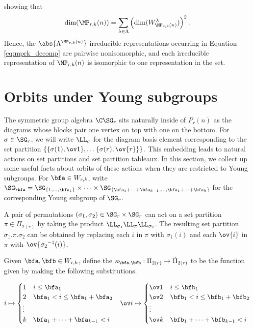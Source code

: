 showing that \begin{align*}
    \dim(\MP_{r,k}(n))=\sum_{\lambda\in\Lambda}\left(\dim(W_{\MP_{r,k}(n)}^\lambda)\right)^2.
\end{align*} Hence, the $\abs{\Lambda^{\MP_{r,k}(n)}}$ irreducible representations occurring in Equation \ref{eq:mprk_decomp} are pairwise nonisomorphic, and each irreducible representation of $\MP_{r,k}(n)$ is isomorphic to one representation in the set.

\section{Orbits under Young subgroups}\label{sec:orbits}

The symmetric group algebra $\C\SG_r$ sits naturally inside of $P_r(n)$ as the diagrams whose blocks pair one vertex on top with one on the bottom. For $\sigma\in\SG_r$, we will write $\LL_\sigma$ for the diagram basis element corresponding to the set partition $\{\{\sigma(1),\ov1\},\dots\{\sigma(r),\ov{r}\}\}$. This embedding leads to natural actions on set partitions and set partition tableaux. In this section, we collect up some useful facts about orbits of these actions when they are restricted to Young subgroups. For $\bfa\in W_{r,k}$, write $\SG_\bfa=\SG_{\{1,\dots,\bfa_1\}}\times\dots\times\SG_{\{\bfa_1+\dots+\bfa_{k-1},\dots,\bfa_1+\dots+\bfa_k\}}$ for the corresponding Young subgroup of $\SG_r$.

A pair of permutations $(\sigma_1,\sigma_2)\in \SG_r\times\SG_r$ can act on a set partition $\pi\in\Pi_{2(r)}$ by taking the product $\LL_{\sigma_1}\LL_{\pi}\LL_{\sigma_2}$. The resulting set partition $\sigma_1.\pi.\sigma_2$ can be obtained by replacing each $i$ in $\pi$ with $\sigma_1(i)$ and each $\ov{i}$ in $\pi$ with $\ov{{\sigma_2}^{-1}(i)}$.

Given $\bfa,\bfb\in W_{r,k}$, define the  $\kappa_{\bfa,\bfb}:\Pi_{2(r)}\to\tilde\Pi_{2(r)}$ to be the function given by making the following substitutions.

\begin{align*}
    i \mapsto \begin{cases}
        1 & i\leq \bfa_1\\
        2 & \bfa_1<i\leq \bfa_1+\bfa_2\\
        \vdots\\
        k & \bfa_1+\dots+\bfa_{k-1}<i
    \end{cases} && \ov i \mapsto \begin{cases}
        \ov1 & i\leq \bfb_1\\
        \ov2 & \bfb_1<i\leq \bfb_1+\bfb_2\\
        \vdots\\
        \ov k & \bfb_1+\dots+\bfb_{k-1}<i
    \end{cases}
\end{align*}

